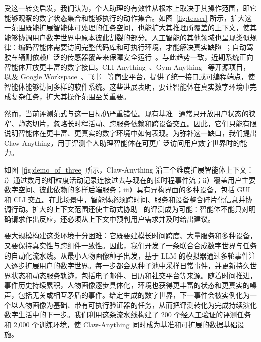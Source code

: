 \documentclass[10pt]{article}
\begin{document}
受这一转变启发，我们认为，个人助理的有效性从根本上取决于其操作范围，即它能够观察的数字状态集合和能够执行的动作集合。如图~\ref{fig:teaser} 所示，扩大这一范围既能扩展智能体可处理的任务空间，也能扩大其推理所覆盖的上下文，使其能够协调用户数字世界中原本彼此割裂的部分。人工智能的其他领域也呈现类似规律：编码智能体需要访问完整代码库和可执行环境，才能解决真实缺陷~\citep{swebench,zhu2026swecontextbench,terminalbench2026}；自动驾驶车辆则依赖广泛的传感器覆盖来保障安全运行~\citep{sun2020scalability}。与此趋势一致，近期系统正向智能体开放更丰富的数字接口。CLI-Anything~\citep{cli-anything2026}、Gym-Anything~\citep{aggarwal2026gym} 等开源项目，以及 Google Workspace~\citep{gws-cli2026}、飞书~\citep{lark-cli2026} 等商业平台，提供了统一接口或可编程端点，使智能体能够访问多样的软件系统。这些进展表明，要让智能体在真实数字环境中完成复杂任务，扩大其操作范围至关重要。

然而，当前评测范式与这一目标仍严重错位。现有基准~\citep{clawbench,wildclawbench,pinchbench,clawmark,qwenclawbench} 通常只开放用户状态的狭窄、静态切片，忽略长时程活动、跨服务依赖和跨设备交互。因此，它们只能有限说明智能体在更丰富、更真实的数字环境中如何表现。为弥补这一缺口，我们提出 Claw-Anything，用于评测个人助理智能体在可更广泛访问用户数字世界时的能力。

如图~\ref{fig:demo_of_three} 所示，Claw-Anything 沿三个维度扩展智能体上下文：i）通过数月的细粒度活动记录连接过去与现在的长时程事件流；ii）覆盖用户主要数字空间、彼此依赖的多样后端服务；iii）具有异构界面的多种设备，包括 GUI 和 CLI 交互。在此场景中，智能体必须跨时间、服务和设备整合碎片化信息并协调行动。扩大的上下文范围还使主动式协助~\citep{ProAgentBench,yang2026contextagent} 的评测成为可能：智能体不能只对明确请求作出反应，还必须从上下文中预判用户需求并及时给出建议。

要大规模构建这类环境十分困难：它既要建模长时间跨度、大量服务和多种设备，又要保持真实性与跨组件一致性。因此，我们开发了一条联合合成数字世界与任务的自动化流水线。从最小人物画像种子出发，基于 LLM 的模拟器通过多轮事件注入逐步扩展用户的数字世界。每一步都会从种子池中采样日常事件，并更新持久世界状态和动态服务轨迹，包括电子邮件、日历和社交平台等来源。随着时间推进，事件历史持续累积，人物画像逐步具体化，环境也获得更丰富的状态和更真实的噪声，包括无关或相互矛盾的事件。给定生成的数字世界，下一事件会被实例化为一个以人物画像为基础、带有可执行验证器的任务，从而把评测转化为完成持续演化数字生活中的下一步。我们利用这条流水线构建了 200 个经人工验证的评测任务和 2,000 个训练环境，使 Claw-Anything 同时成为基准和可扩展的数据基础设施。
\end{document}
